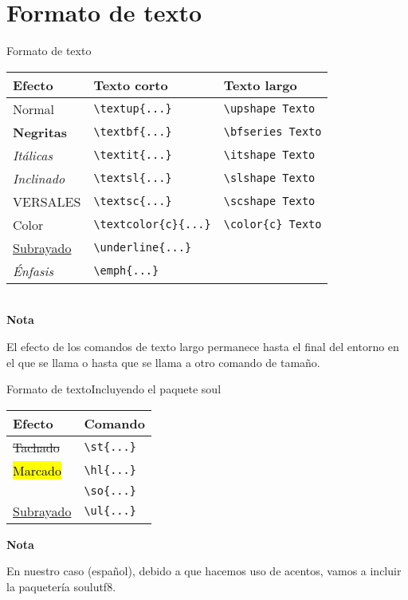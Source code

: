 \documentclass[10pt,xcolor={dvipsnames}]{beamer}
\begin{document}
\section{Formato de texto}
\begin{frame}{Formato de texto}
\begin{tabular}{lll}
	Efecto & Texto corto & Texto largo \\ 
	\hline
	Normal& {\tt\textbackslash textup\{...\}} & {\tt\textbackslash upshape Texto} \\
	\textbf{Negritas}& 	{\tt\textbackslash textbf\{...\}} & {\tt\textbackslash bfseries Texto} \\
	\textit{Itálicas}& {\tt\textbackslash textit\{...\}} & {\tt\textbackslash itshape Texto} \\
	\textsl{Inclinado}& {\tt\textbackslash textsl\{...\}} & {\tt\textbackslash slshape Texto} \\
	\textsc{VERSALES} & {\tt\textbackslash textsc\{...\}} & {\tt\textbackslash scshape Texto} \\
	\textcolor{c}{Color}& {\tt\textbackslash textcolor\{c\}\{...\}} & {\tt\textbackslash color\{c\} Texto} \\
	\underline{Subrayado}& {\tt\textbackslash underline\{...\}} &  \\
	\emph{Énfasis}& {\tt\textbackslash emph\{...\}} &  \\ 	
\end{tabular} \\

\textbf{Nota}

El efecto de los comandos de texto largo permanece hasta el final del entorno en el que se llama o hasta que se llama a otro comando de tamaño.
\end{frame}

\begin{frame}{Formato de texto}{Incluyendo el paquete soul}
\begin{center}
	\begin{tabular}{ll}
		Efecto & Comando \\
		\hline
		\st{Tachado} & {\tt\textbackslash st\{...\}}\\ 
		\hl{Marcado} & {\tt\textbackslash hl\{...\}}\\
		\so{Espaciado} & {\tt\textbackslash so\{...\}}\\
		\ul{Subrayado} & {\tt\textbackslash ul\{...\}}\\   
	\end{tabular}
\end{center}
\textbf{Nota}

En nuestro caso (español), debido a que hacemos uso de acentos, vamos a incluir la paquetería soulutf8.
\end{frame}
\end{document}
